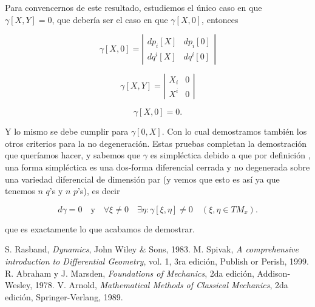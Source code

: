 \documentclass[a4paper,10pt]{article}
\numberwithin{equation}{section}
\begin{document}
\vspace{.3cm}

Para convencernos de este resultado, estudiemos el único caso en que $\gamma[X,Y] = 0$, 
que debería ser el caso en que $\gamma[X,0]$, entonces 

\begin{equation}
 \gamma[X,0] = \left|\begin{matrix}
                dp_i[X] & dp_i[0] \\
                dq^i[X] & dq^i[0]
               \end{matrix}\right|
\end{equation}

\begin{equation}
 \gamma[X,Y] = \left|\begin{matrix}
                X_i & 0 \\
                X^i & 0
               \end{matrix}\right|
\end{equation}

\begin{equation}
 \gamma[X,0] = 0.
\end{equation}

Y lo mismo se debe cumplir para $\gamma[0,X]$. Con lo cual demostramos también los otros 
criterios para la no degeneración. Estas pruebas completan la demostración que queríamos 
hacer, y sabemos que $\gamma$ es simpléctica debido a que por definición \cite{rasband,abraham,arnold},
una forma simpléctica es una dos-forma diferencial cerrada y no degenerada sobre 
una variedad diferencial de dimensión par (y vemos que esto es así ya que tenemos 
$n$ $q$'s y $n$ $p$'s), es decir 

\begin{equation}
 d\gamma = 0 \quad \text{y} \quad \forall \xi \ne 0 \quad \exists \eta: \gamma[\xi,\eta] \ne 0 
 \quad (\xi,\eta \in TM_x).
\end{equation}

que es exactamente lo que acabamos de demostrar.


\begin{thebibliography}{10}
S. Rasband, \emph{Dynamics}, John Wiley \& Sons, 1983.
M. Spivak, \emph{A comprehensive introduction to Differential Geometry}, vol. 1, 
3ra edición, Publish or Perish, 1999.
 R. Abraham y J. Marsden, \emph{Foundations of Mechanics}, 2da edición, Addison-Wesley,
 1978.
V. Arnold, \emph{Mathematical Methods of Classical Mechanics}, 2da edición, Springer-Verlang, 
1989.
 
\end{thebibliography}
\end{document}
